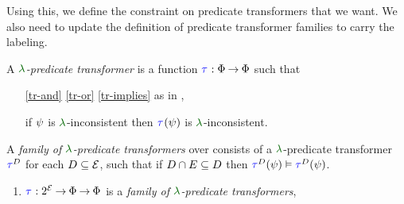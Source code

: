 Using this, we define the constraint on predicate transformers that we want.
We also need to update the definition of predicate transformer families to
carry the labeling.
\begin{definition}
  \label{def:trans'}
  A \emph{$\labeling$-predicate transformer} is a %
  function
  $\aTr{}{}:\Formulae\fun\Formulae$ such that
  \begin{enumerate}[,label=(\textsc{x}\arabic*),ref=\textsc{x}\arabic*]
  \item[\eqref{tr-and}]
    \eqref{tr-or}\;
    \eqref{tr-implies}\; as in ,
  \item[{\labeltext[\textsc{x}4]{(\textsc{x}4)}{tr-false}}] 
    if $\psi$ is $\labeling$-inconsistent then $\aTr{}{\bForm}$ is $\labeling$-inconsistent.
  \end{enumerate}

  \label{def:family'}
  A \emph{family of $\labeling$-predicate transformers} over consists of a
  $\labeling$-predicate transformer $\aTr{\bEvs}{}$ for each
  $D\subseteq\mathcal{E}$, such that if $D \cap E \subseteq D$
  then $\aTr{\cEvs}{\bForm} \rimplies \aTr{\bEvs}{\bForm}$.

  
  \begin{enumerate}[,label=(\textsc{m}\arabic*),ref=\textsc{m}\arabic*]
  \setcounter{enumi}{\value{Btau}}
  \item \label{pom-tau'}
    $\aTr{}{}:2^{\AllEvents}\fun\Formulae \fun\Formulae$ is a \emph{family of $\labeling$-predicate transformers}, 
  \end{enumerate}
\end{definition}

